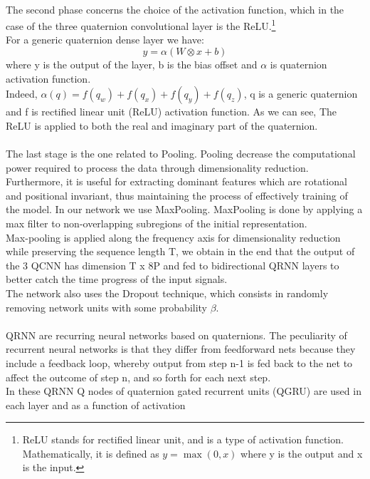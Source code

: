\documentclass{article}
\begin{document}
    \\ The second phase concerns the choice of the activation function, which in the case of the three quaternion convolutional layer 
    is the ReLU.\footnote{ReLU stands for rectified linear unit, and is a type of activation function. Mathematically, it is defined 
    as $y = \max(0, x)$ where y is the output and x is the input.}
    \\ For a generic quaternion dense layer we have:
    \begin{equation*}
        y = \alpha( W \otimes x + b)
    \end{equation*}
    where  y is the output of the layer, b is the bias offset and $\alpha$ is quaternion activation function.
    \\ Indeed,  $\alpha(q) = f(q_w) + f(q_x) + f(q_y) + f(q_z)$, q is a generic quaternion and f is rectified linear unit (ReLU) 
    activation function. As we can see, The ReLU is applied to both the real and imaginary part of the quaternion.
    \\ \\ The last stage is the one related to Pooling. Pooling decrease the computational power required to process the data through 
    dimensionality reduction. Furthermore, it is useful for extracting dominant features which are rotational and positional invariant,
    thus maintaining the process of effectively training of the model. In our network we use MaxPooling.
    MaxPooling is done by applying a max filter to non-overlapping subregions of the initial representation.
    \\ Max-pooling is applied along the frequency axis for 
    dimensionality reduction while preserving the sequence length T, we obtain in the end that the output of the 3 QCNN has 
    dimension T x 8P and fed to bidirectional QRNN layers to better catch the time progress of the input signals.  
    \\ The network also uses the Dropout technique, which consists in randomly removing network units with some probability $\beta$.
    \\ \\ QRNN are recurring neural networks based on quaternions.
    The peculiarity of recurrent neural networks is that they differ from feedforward nets because they include a feedback loop,
    whereby output from step n-1 is fed back to the net to affect the outcome of step n, and so forth for each next step.
    \\ In these QRNN Q nodes of quaternion gated recurrent units (QGRU) are used in each layer and as a function of activation
\end{document}
